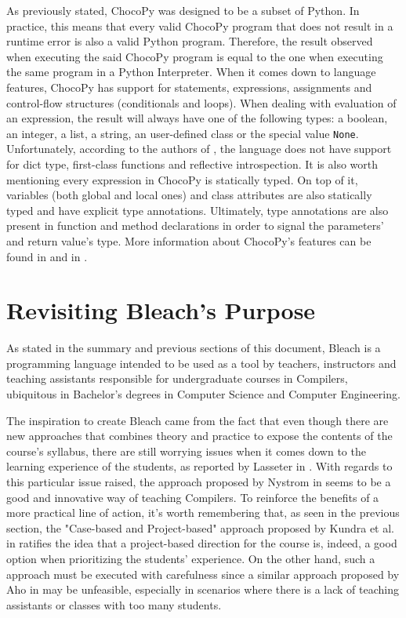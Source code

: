 \begin{itemize}
    As previously stated, ChocoPy was designed to be a subset of Python. In practice, this means that every valid ChocoPy program that does not result in a runtime error is also a valid Python program. Therefore, the result observed when executing the said ChocoPy program is equal to the one when executing the same program in a Python Interpreter. When it comes down to language features, ChocoPy has support for statements, expressions, assignments and control-flow structures (conditionals and loops). When dealing with evaluation of an expression, the result will always have one of the following types: a boolean, an integer, a list, a string, an user-defined class or the special value \texttt{None}. Unfortunately, according to the authors of \cite{padhye2019chocopy}, the language does not have support for dict type, first-class functions and reflective introspection. It is also worth mentioning every expression in ChocoPy is statically typed. On top of it, variables (both global and local ones) and class attributes are also statically typed and have explicit type annotations. Ultimately, type annotations are also present in function and method declarations in order to signal the parameters' and return value's type. More information about ChocoPy's features can be found in \cite{padhye2019chocopy} and in \cite{chocopy_v2.2_language_manual_reference}.
    
\end{itemize}

\section{Revisiting Bleach's Purpose}
As stated in the summary and previous sections of this document, Bleach is a programming language intended to be used as a tool by teachers, instructors and teaching assistants responsible for undergraduate courses in Compilers, ubiquitous in Bachelor's degrees in Computer Science and Computer Engineering.

The inspiration to create Bleach came from the fact that even though there are new approaches that combines theory and practice to expose the contents of the course's syllabus, there are still worrying issues when it comes down to the learning experience of the students, as reported by Lasseter in \cite{lasseter2015interpreter}. With regards to this particular issue raised, the approach proposed by Nystrom in \cite{nystrom2021crafting} seems to be a good and innovative way of teaching Compilers. To reinforce the benefits of a more practical line of action, it's worth remembering that, as seen in the previous section, the "Case-based and Project-based" approach proposed by Kundra et al. in \cite{kundra2016experience} ratifies the idea that a project-based direction for the course is, indeed, a good option when prioritizing the students' experience. On the other hand, such a approach must be executed with carefulness since a similar approach proposed by Aho in \cite{aho2008teaching} may be unfeasible, especially in scenarios where there is a lack of teaching assistants or classes with too many students.

